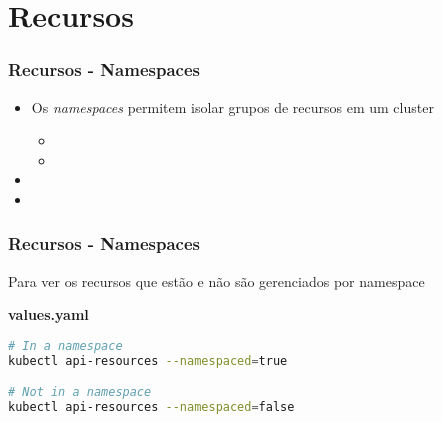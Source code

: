 \section{Recursos}

\begin{frame}
\frametitle{Recursos - Namespaces}

\begin{itemize}
	\item Os \textit{namespaces} permitem isolar grupos de recursos em um cluster
		\begin{itemize}
			\item {}
			\item {}
		\end{itemize}
	\item {}
	\item {}
\end{itemize}
\end{frame}

\begin{frame}[containsverbatim]
\frametitle{Recursos - Namespaces}

Para ver os recursos que estão e não são gerenciados por namespace

\begin{center}
\begin{minipage}{0.9\textwidth}
\begin{block}{\textbf{values.yaml}}
\begin{lstlisting}[language=bash]
# In a namespace
kubectl api-resources --namespaced=true

# Not in a namespace
kubectl api-resources --namespaced=false
\end{lstlisting}
\end{block}
\end{minipage}
\end{center}
\end{frame}

